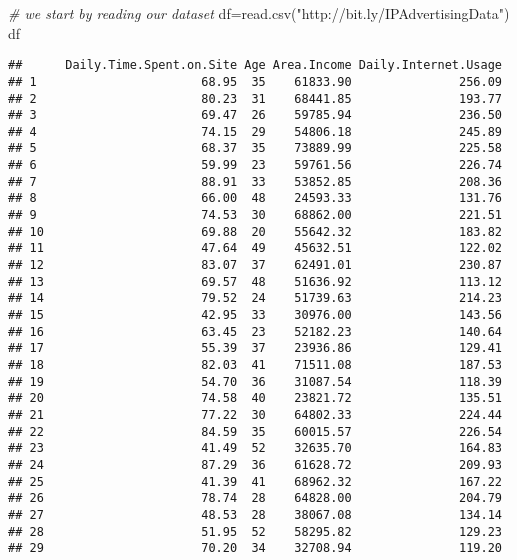 \documentclass[
]{article}
\newenvironment{Shaded}{\begin{snugshade}}{\end{snugshade}}
\newcommand{\CommentTok}[1]{\textcolor[rgb]{0.56,0.35,0.01}{\textit{#1}}}
\newcommand{\FunctionTok}[1]{\textcolor[rgb]{0.00,0.00,0.00}{#1}}
\newcommand{\NormalTok}[1]{#1}
\newcommand{\OtherTok}[1]{\textcolor[rgb]{0.56,0.35,0.01}{#1}}
\newcommand{\StringTok}[1]{\textcolor[rgb]{0.31,0.60,0.02}{#1}}
\begin{document}
\begin{Shaded}
\begin{Highlighting}[]
\CommentTok{\# we start by reading our dataset}
\NormalTok{df}\OtherTok{=}\FunctionTok{read.csv}\NormalTok{(}\StringTok{"http://bit.ly/IPAdvertisingData"}\NormalTok{)}
\NormalTok{df}
\end{Highlighting}
\end{Shaded}

\begin{verbatim}
##      Daily.Time.Spent.on.Site Age Area.Income Daily.Internet.Usage
## 1                       68.95  35    61833.90               256.09
## 2                       80.23  31    68441.85               193.77
## 3                       69.47  26    59785.94               236.50
## 4                       74.15  29    54806.18               245.89
## 5                       68.37  35    73889.99               225.58
## 6                       59.99  23    59761.56               226.74
## 7                       88.91  33    53852.85               208.36
## 8                       66.00  48    24593.33               131.76
## 9                       74.53  30    68862.00               221.51
## 10                      69.88  20    55642.32               183.82
## 11                      47.64  49    45632.51               122.02
## 12                      83.07  37    62491.01               230.87
## 13                      69.57  48    51636.92               113.12
## 14                      79.52  24    51739.63               214.23
## 15                      42.95  33    30976.00               143.56
## 16                      63.45  23    52182.23               140.64
## 17                      55.39  37    23936.86               129.41
## 18                      82.03  41    71511.08               187.53
## 19                      54.70  36    31087.54               118.39
## 20                      74.58  40    23821.72               135.51
## 21                      77.22  30    64802.33               224.44
## 22                      84.59  35    60015.57               226.54
## 23                      41.49  52    32635.70               164.83
## 24                      87.29  36    61628.72               209.93
## 25                      41.39  41    68962.32               167.22
## 26                      78.74  28    64828.00               204.79
## 27                      48.53  28    38067.08               134.14
## 28                      51.95  52    58295.82               129.23
## 29                      70.20  34    32708.94               119.20

\end{verbatim}
\end{document}

